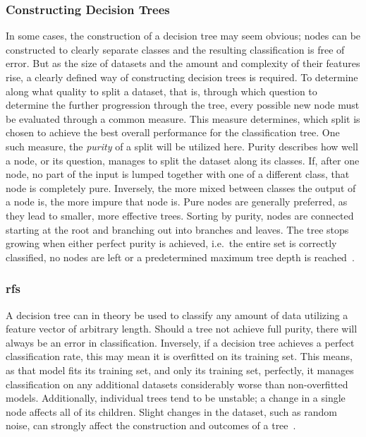 \subsubsection{Constructing Decision Trees}

In some cases, the construction of a decision tree may seem obvious; nodes can 
be constructed to clearly separate classes and the resulting classification is
free of error. But as the size of datasets and the amount and complexity of 
their features rise, a clearly defined way of constructing decision trees is 
required. To determine along what quality to split a dataset, that is, through
which question to determine the further progression through the tree, every
possible new node must be evaluated through a common measure. This measure 
determines, which split is chosen to achieve the best overall performance for
the classification tree. One such measure, the \textit{purity} of a split will
be utilized here.
Purity describes how well a node, or its question, manages to split the dataset
along its classes. If, after one node, no part of the input is lumped together
with one of a different class, that node is completely pure. Inversely, the more
mixed between classes the output of a node is, the more impure that node is.
Pure nodes are generally preferred, as they lead to smaller, more effective 
trees. Sorting by purity, nodes are connected starting at the root and branching
out into branches and leaves. The tree stops growing when either perfect purity
is achieved, i.e.~the entire set is correctly classified, no nodes are left or
a predetermined maximum tree depth is reached~\cite{classification_and_regression_trees,gini_index_vs_information_gain,decision_tree_learning}.

\subsubsection{\aclp{rf}}

A decision tree can in theory be used to classify any amount of data utilizing
a feature vector of arbitrary length. Should a tree not achieve full purity, 
there will always be an error in classification. Inversely, if a decision tree
achieves a perfect classification rate, this may mean it is overfitted on its 
training set. This means, as that model fits its training set, and only its 
training set, perfectly, it manages classification on any additional datasets
considerably worse than non-overfitted models. Additionally, individual trees
tend to be unstable; a change in a single node affects all of its children.
Slight changes in the dataset, such as random noise, can strongly affect the
construction and outcomes of a 
tree~\cite{elements_of_statistical_learning,classification_and_regression_trees}.

